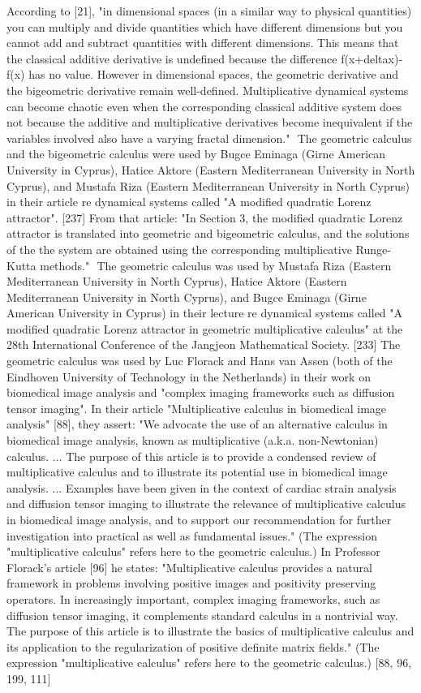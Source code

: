 \documentclass[12pt]{article}
\begin{document}
According to [21], "in dimensional spaces (in a similar way to physical quantities) you can multiply and divide quantities which have different dimensions but you cannot add and subtract quantities with different dimensions. This means that the classical additive derivative is undefined because the difference f(x+deltax)-f(x) has no value. However in dimensional spaces, the geometric derivative and the bigeometric derivative remain well-defined. Multiplicative dynamical systems can become chaotic even when the corresponding classical additive system does not because the additive and multiplicative derivatives become inequivalent if the variables involved also have a varying fractal dimension."
 The geometric calculus and the bigeometric calculus were used by Bugce Eminaga (Girne American University in Cyprus), Hatice Aktore (Eastern Mediterranean University in North Cyprus), and Mustafa Riza (Eastern Mediterranean University in North Cyprus) in their article re dynamical systems called "A modified quadratic Lorenz attractor". [237] From that article: "In Section 3, the modified quadratic Lorenz attractor is translated into geometric and bigeometric calculus, and the solutions of the the system are obtained using the corresponding multiplicative Runge-Kutta methods."  The geometric calculus was used by Mustafa Riza (Eastern Mediterranean University in North Cyprus), Hatice Aktore (Eastern Mediterranean University in North Cyprus), and Bugce Eminaga (Girne American University in Cyprus) in their lecture re dynamical systems called "A modified quadratic Lorenz attractor in geometric multiplicative calculus" at the 28th International Conference of the Jangjeon Mathematical Society. [233]
The geometric calculus was used by Luc Florack and Hans van Assen (both of the Eindhoven University of Technology in the Netherlands) in their work on biomedical image analysis and "complex imaging frameworks such as diffusion tensor imaging". In their article "Multiplicative calculus in biomedical image analysis" [88], they assert: "We advocate the use of an alternative calculus in biomedical image analysis, known as multiplicative (a.k.a. non-Newtonian) calculus. ... The purpose of this article is to provide a condensed review of multiplicative calculus and to illustrate its potential use in biomedical image analysis. ... Examples have been given in the context of cardiac strain analysis and diffusion tensor imaging to illustrate the relevance of multiplicative calculus in biomedical image analysis, and to support our recommendation for further investigation into practical as well as fundamental issues." (The expression "multiplicative calculus" refers here to the geometric calculus.) In Professor Florack's article [96] he states: "Multiplicative calculus provides a natural framework in problems involving positive images and positivity preserving operators. In increasingly important, complex imaging frameworks, such as diffusion tensor imaging, it complements standard calculus in a nontrivial way. The purpose of this article is to illustrate the basics of multiplicative calculus and its application to the regularization of positive definite matrix fields." (The expression "multiplicative calculus" refers here to the geometric calculus.) [88, 96, 199, 111]
\end{document}
